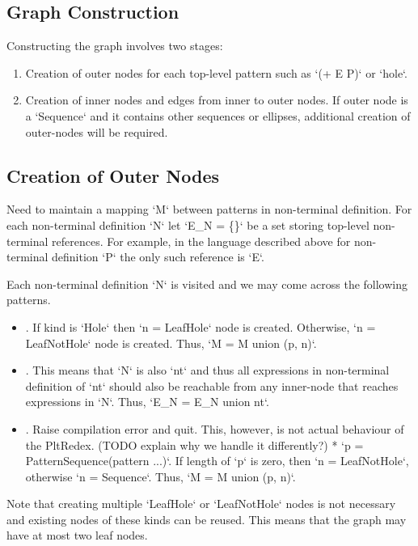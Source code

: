 \subsection{Graph Construction}

Constructing the graph involves two stages: 
\begin{enumerate}
\item
Creation of outer nodes for each top-level pattern such as `(+ E P)` or `hole`.
\item
Creation of inner nodes and edges from inner to outer nodes. If outer node is a `Sequence` and it contains other sequences or ellipses, additional creation of outer-nodes will be required. 
\end{enumerate}


\subsection{Creation of Outer Nodes}

Need to maintain a mapping `M` between patterns in non-terminal definition. For each non-terminal definition `N` let `E\_N = \{\}` be a set storing top-level non-terminal references. For example, in the language described above for non-terminal definition `P` the only such reference is `E`.

Each non-terminal definition `N` is visited and we may come across the following patterns.
\begin{itemize}

\item
\BuiltInPattern. If kind is `Hole` then `n = LeafHole` node is created.  Otherwise, `n = LeafNotHole` node is created. Thus, `M = M union {(p, n)}`.
\item
\Nt. This means that `N` is also `nt` and thus all expressions in non-terminal definition of `nt` should also be reachable from any inner-node that reaches expressions in `N`. Thus, `E\_N = E\_N union {nt}`.
\item
\InHolePattern. Raise compilation error and quit. This, however, is not actual behaviour of the PltRedex. (TODO explain why we handle it differently?)
* `p = PatternSequence(pattern ...)`. If length of `p` is zero, then `n = LeafNotHole`, otherwise `n = Sequence`. Thus, `M = M union {(p, n)}`.
\end{itemize}

Note that creating multiple `LeafHole` or `LeafNotHole` nodes is not necessary and existing nodes of these kinds can be reused. This means that the graph may have at most two leaf nodes.


